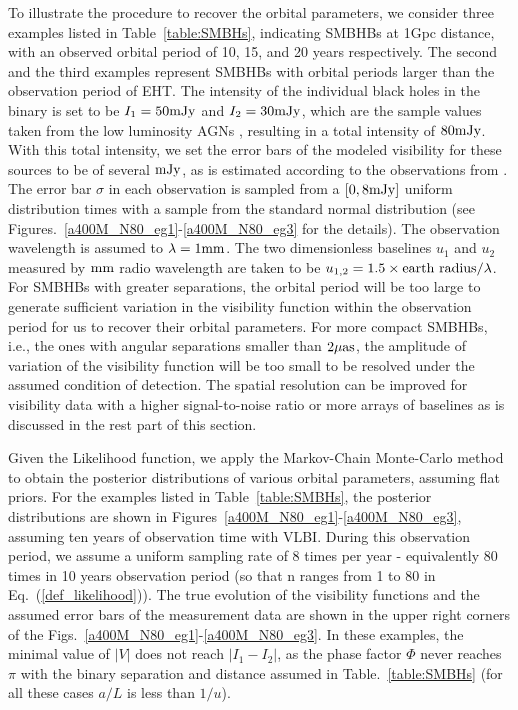 \documentclass[twocolumn]{aastex62}
\begin{document}
To illustrate the procedure to recover the orbital parameters, we consider three examples listed in Table~\ref{table:SMBHs}, indicating SMBHBs at 1Gpc distance, with an observed orbital period of 10, 15, and 20 years respectively. The second and the third examples represent SMBHBs with orbital periods larger than the observation period of EHT. The intensity of the individual black holes in the binary is set to be $I_1=50 {\rm mJy}$ and $I_2=30 {\rm mJy}$, which are the sample values taken from the low luminosity AGNs \citep{D_Orazio_2018VLBI}, resulting in a total intensity of $80 {\rm mJy}$. With this total intensity, we set the error bars of the modeled visibility for these sources to be of several ${\rm mJy}$, as is estimated according to the observations from \citep{Breiding2021VLBI}. The error bar $\sigma$ in each observation is sampled from a $[0, 8{\rm mJy}]$ uniform distribution times with a sample from the standard normal distribution (see Figures.~\ref{a400M_N80_eg1}-\ref{a400M_N80_eg3} for the details). The observation wavelength is assumed to  $\lambda=1{\rm mm}$. 
The two dimensionless baselines $u_{1}$ and $u_{2}$ measured by ${\rm mm}$ radio wavelength are taken to be $u_{1,2}=1.5 \times {\rm earth\ radius}/ \lambda$. 
For SMBHBs with greater separations, the orbital period will be too large to generate sufficient  variation in the visibility function within the observation period for us to recover their orbital parameters. For more compact SMBHBs, i.e., the ones with angular separations smaller than $2\mu {\rm as}$, the amplitude of variation of the visibility function will be too small to be resolved under the assumed condition of detection. The spatial resolution can be improved for visibility data with a higher signal-to-noise ratio or more arrays of baselines as is discussed in the rest part of this section. 

Given the Likelihood function, we apply the Markov-Chain Monte-Carlo method to obtain the posterior distributions of various orbital parameters, assuming flat priors. For the examples listed in Table~\ref{table:SMBHs}, the posterior distributions are shown in Figures~\ref{a400M_N80_eg1}-\ref{a400M_N80_eg3}, assuming ten years of observation time with VLBI.  During this observation period, we assume a uniform sampling rate of  8 times per year - equivalently 80 times in 10 years observation period (so that n ranges from 1 to 80 in Eq.~(\ref{def_likelihood})). 
The true evolution of the visibility functions and the assumed error bars of the measurement data  are shown in the upper right corners of the Figs.~\ref{a400M_N80_eg1}-\ref{a400M_N80_eg3}. In these examples, the minimal value of $|V|$  does not reach $|I_1-I_2| $,   as the phase factor $\Phi$  never reaches $\pi$ with the binary separation and distance assumed in Table.~\ref{table:SMBHs} (for all these cases $a/L$ is less than $1/u$). 
\end{document}
